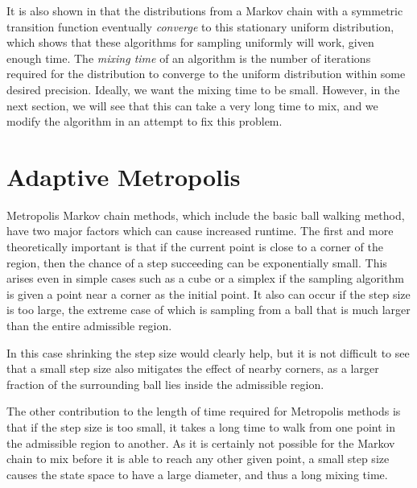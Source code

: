 \documentclass[11pt]{article}
\begin{document}
It is also shown in \cite{Smith} that the distributions from a Markov chain with a symmetric transition function eventually \emph{converge} to this stationary uniform distribution, which shows that these algorithms for sampling uniformly will work, given enough time. The \emph{mixing time} of an algorithm is the number of iterations required for the distribution to converge to the uniform distribution within some desired precision. Ideally, we want the mixing time to be small. However, in the next section, we will see that this can take a very long time to mix, and we modify the algorithm in an attempt to fix this problem.


\section{Adaptive Metropolis}

Metropolis Markov chain methods, which include the basic ball walking method, have two major factors which can cause increased runtime. The first and more theoretically important is that if the current point is close to a corner of the region, then the chance of a step succeeding can be exponentially small. This arises even in simple cases such as a cube or a simplex if the sampling algorithm is given a point near a corner as the initial point. It also can occur if the step size is too large, the extreme case of which is sampling from a ball that is much larger than the entire admissible region. 

In this case shrinking the step size would clearly help, but it is not difficult to see that a small step size also mitigates the effect of nearby corners, as a larger fraction of the surrounding ball lies inside the admissible region.

The other contribution to the length of time required for Metropolis methods is that if the step size is too small, it takes a long time to walk from one point in the admissible region to another. As it is certainly not possible for the Markov chain to mix before it is able to reach any other given point, a small step size causes the state space to have a large diameter, and thus a long mixing time.
\end{document}

